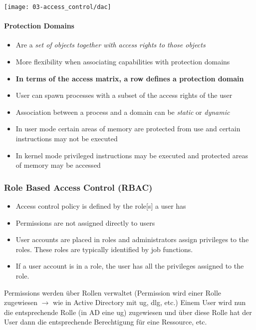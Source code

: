 \begin{center}
    \texttt{[image: 03-access\_control/dac]}
    \vspace{-8pt}
\end{center}

\paragraph{Protection Domains}
\begin{itemize}
    \item Are a \textit{set of objects together with access rights to those objects}
    \item More flexibility when associating capabilities with protection domains
    \item \textbf{In terms of the access matrix, a row defines a protection domain}
    \item User can spawn processes with a subset of the access rights of the user
    \item Association between a process and a domain can be \textit{static} or \textit{dynamic}
    \item In user mode certain areas of memory are protected from use and certain instructions may not be executed
    \item In kernel mode privileged instructions may be executed and protected areas of memory may be accessed
\end{itemize}

\subsubsection{Role Based Access Control (RBAC)}
\begin{itemize}
    \item Access control policy is defined by the role[s] a user has
    \item Permissions are not assigned directly to users
    \item User accounts are placed in roles and administrators assign privileges to the roles. These roles are typically identified by job functions.
    \item If a user account is in a role, the user has all the privileges assigned to the role.\\
\end{itemize}

Permissions werden über Rollen verwaltet (Permission wird einer Rolle zugewiesen $\rightarrow$ wie in Active Directory mit ug, dlg, etc.)
Einem User wird nun die entsprechende Rolle (in AD eine ug) zugewiesen und über diese Rolle hat der User dann die entsprechende Berechtigung für eine Ressource, etc.

